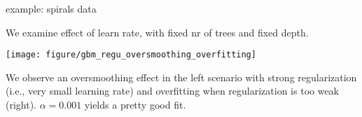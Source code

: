 \documentclass[11pt,compress,t,notes=noshow, xcolor=table]{beamer}
\begin{document}









% 
% 
% 
% 

\begin{vbframe}{example: spirals data}

We examine effect of learn rate, with fixed nr of trees and fixed depth.

\vfill

\texttt{[image: figure/gbm\_regu\_oversmoothing\_overfitting]}

\vfill

We observe an oversmoothing effect in the left scenario with strong 
regularization (i.e., very small learning rate) and overfitting when 
regularization is too weak (right). $\alpha = 0.001$  yields a pretty good fit.

\end{vbframe}
\end{document}
